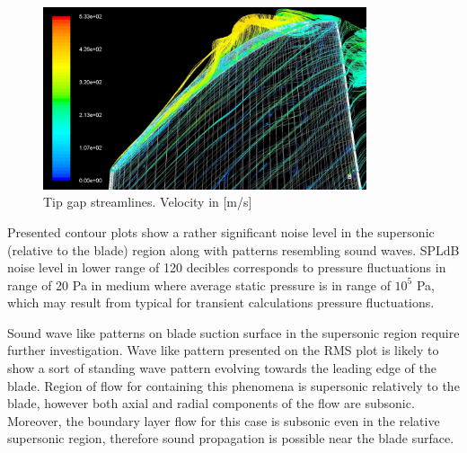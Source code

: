 \begin{figure}[h!]
\centering %
\includegraphics[width=0.85\textwidth]{Pictures/tip_stream.jpg}
\caption{Tip gap streamlines. Velocity in [m/s]}
\label{tip_stream}
\end{figure}

Presented contour plots show a rather significant noise level in the supersonic (relative to the blade) region along with patterns resembling sound waves. SPLdB noise level in lower range of 120 decibles corresponds to pressure fluctuations in range of 20 Pa in medium where average static pressure is in range of $10^5$ Pa, which may result from typical for transient calculations pressure fluctuations. 

Sound wave like patterns on blade suction surface in the supersonic region require further investigation. Wave like pattern presented on the RMS plot is likely to show a sort of standing wave pattern evolving towards the leading edge of the blade. Region of flow for containing this phenomena is supersonic relatively to the blade, however both axial and radial components of the flow are subsonic. Moreover, the boundary layer flow for this case is subsonic even in the relative supersonic region, therefore sound propagation is possible near the blade surface.


